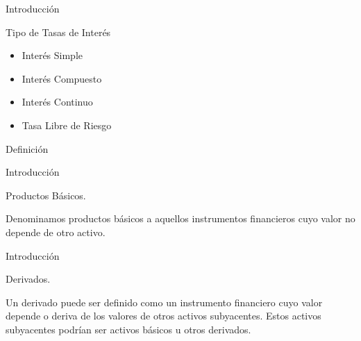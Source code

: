 \documentclass{beamer}
\begin{document}
\begin{frame}{Introducci\'on}
  
  \begin{block}{Tipo de Tasas de Inter\'es}
    \begin{itemize}[<+->]
        \item Inter\'es Simple
        \item Inter\'es Compuesto
        \item Inter\'es Continuo
        \item Tasa Libre de Riesgo
    \end{itemize}
  \end{block}

    \begin{block}{Definici\'on}
    \end{block}

\end{frame}

\begin{frame}{Introducci\'on}

    \begin{block}{Productos B\'asicos.}

    Denominamos productos b\'asicos a aquellos instrumentos financieros cuyo valor no depende de
    otro activo.

    \end{block}

\end{frame}


\begin{frame}{Introducci\'on}

    \begin{block}{Derivados.}

    Un derivado puede ser definido como un instrumento financiero cuyo valor
    depende o deriva de los valores de otros activos subyacentes. Estos activos
    subyacentes podr\'ian ser activos b\'asicos u otros derivados.

    \end{block}

\end{frame}
\end{document}

